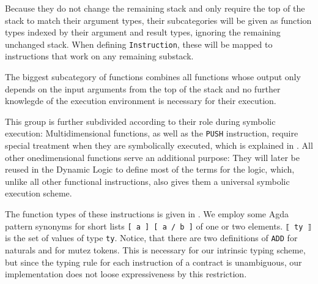 Because they do not change the remaining stack and only require the top of the stack to match
their argument types, their subcategories will be given as function types indexed by their
argument and result types, ignoring the remaining unchanged stack.
When defining \verb/Instruction/,
these will be mapped to instructions that work on any remaining substack.

The biggest subcategory of functions combines all functions
whose output only depends on the input arguments from the top of the stack
and no further knowlegde of the execution environment is necessary for their execution.

This group is further subdivided according to their role during symbolic execution:
Multidimensional functions, as well as the \verb/PUSH/ instruction, require special
treatment when they are symbolically executed, which is explained in .
All other onedimensional functions serve an additional purpose:
They will later be reused in the Dynamic Logic to define most of the terms for the logic, which,
unlike all other functional instructions, also gives them a universal symbolic execution scheme.

The function types of these instructions is given in .
We employ some Agda pattern synonyms for short lists \verb|[ a ] [ a / b ]|
of one or two elements.
\verb/⟦ ty ⟧/ is the set of values of type \verb/ty/.
Notice, that there are two definitions of \verb/ADD/ for naturals and for mutez tokens.
This is necessary for our intrinsic typing scheme, but since the typing rule for each instruction
of a contract is unambiguous, our implementation does not loose expressiveness by this restriction.

